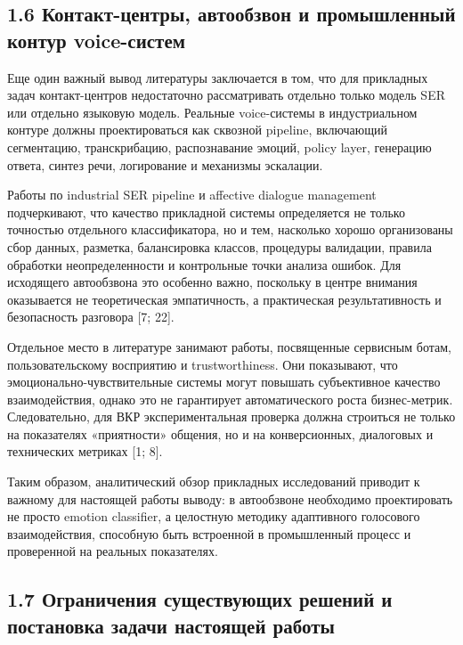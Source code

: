 \documentclass[a4paper,14pt]{extarticle}
\begin{document}
\subsection{1.6 Контакт-центры, автообзвон и промышленный контур
voice-систем}\label{ux43aux43eux43dux442ux430ux43aux442-ux446ux435ux43dux442ux440ux44b-ux430ux432ux442ux43eux43eux431ux437ux432ux43eux43d-ux438-ux43fux440ux43eux43cux44bux448ux43bux435ux43dux43dux44bux439-ux43aux43eux43dux442ux443ux440-voice-ux441ux438ux441ux442ux435ux43c}

Еще один важный вывод литературы заключается в том, что для прикладных
задач контакт-центров недостаточно рассматривать отдельно только модель
SER или отдельно языковую модель. Реальные voice-системы в
индустриальном контуре должны проектироваться как сквозной pipeline,
включающий сегментацию, транскрибацию, распознавание эмоций, policy
layer, генерацию ответа, синтез речи, логирование и механизмы эскалации.

Работы по industrial SER pipeline и affective dialogue management
подчеркивают, что качество прикладной системы определяется не только
точностью отдельного классификатора, но и тем, насколько хорошо
организованы сбор данных, разметка, балансировка классов, процедуры
валидации, правила обработки неопределенности и контрольные точки
анализа ошибок. Для исходящего автообзвона это особенно важно, поскольку
в центре внимания оказывается не теоретическая эмпатичность, а
практическая результативность и безопасность разговора {[}7; 22{]}.

Отдельное место в литературе занимают работы, посвященные сервисным
ботам, пользовательскому восприятию и trustworthiness. Они показывают,
что эмоционально-чувствительные системы могут повышать субъективное
качество взаимодействия, однако это не гарантирует автоматического роста
бизнес-метрик. Следовательно, для ВКР экспериментальная проверка должна
строиться не только на показателях «приятности» общения, но и на
конверсионных, диалоговых и технических метриках {[}1; 8{]}.

Таким образом, аналитический обзор прикладных исследований приводит к
важному для настоящей работы выводу: в автообзвоне необходимо
проектировать не просто emotion classifier, а целостную методику
адаптивного голосового взаимодействия, способную быть встроенной в
промышленный процесс и проверенной на реальных показателях.

\subsection{1.7 Ограничения существующих решений и постановка задачи
настоящей
работы}\label{ux43eux433ux440ux430ux43dux438ux447ux435ux43dux438ux44f-ux441ux443ux449ux435ux441ux442ux432ux443ux44eux449ux438ux445-ux440ux435ux448ux435ux43dux438ux439-ux438-ux43fux43eux441ux442ux430ux43dux43eux432ux43aux430-ux437ux430ux434ux430ux447ux438-ux43dux430ux441ux442ux43eux44fux449ux435ux439-ux440ux430ux431ux43eux442ux44b}
\end{document}
